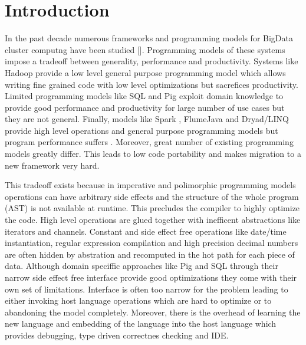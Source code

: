 \section{Introduction}
\label{sec:introduction}

In the past decade numerous frameworks and programming models for BigData cluster computng have been studied []. Programming models of these systems impose a tradeoff between generality, performance and productivity. Systems like Hadoop  provide a low level general purpose programming model which allows writing fine grained code with low level optimizations but sacrefices productivity. Limited programming models like SQL and Pig exploit domain knowledge to provide good performance and productivity for large number of use cases but they are not general. Finally, models like Spark , FlumeJava  and Dryad/LINQ  provide high level operations and general purpose programming models but program performance suffers . Moreover, great number of existing programming models greatly differ. This leads to low code portability and makes migration to a new framework very hard. 

This tradeoff exists because in imperative and polimorphic programming models operations can have arbitrary side effects and the structure of the whole program (AST) is not available at runtime. This precludes the compiler to highly optimize the code. High level operations are glued together with inefficent abstractions like iterators and channels. Constant and side effect free operations like date/time instantiation, regular expression compilation and high precision decimal numbers are often hidden by abstration and recomputed in the hot path for each piece of data. Although domain speciffic approaches like Pig and SQL through their narrow side effect free interface provide good optimizations they come with their own set of limitations. Interface is often too narrow for the problem leading to either invoking host language operations which are hard to optimize or to abandoning the model completely. Moreover, there is the overhead of learning the new language and embedding of the language into the host language which provides debugging, type driven correctnes checking and IDE.     



